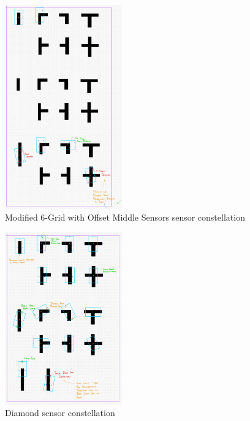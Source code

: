 \documentclass[conference]{IEEEtran}
\begin{document}
\begin{figure}[H]
	\centerline{\includegraphics[width=0.45\textwidth]{constellation-6-offset.png}}
	\caption{Modified 6-Grid with Offset Middle Sensors sensor constellation}
	\label{fig:constellation-6-offset}
\end{figure}
\begin{figure}[H]
	\centerline{\includegraphics[width=0.45\textwidth]{constellation-diamond.png}}
	\caption{Diamond sensor constellation}
	\label{fig:constellation-diamond}
\end{figure}
\end{document}
